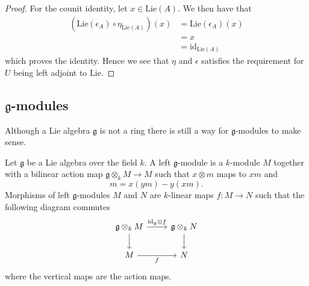 \begin{proof}
  For the counit identity, let $ x \in \text{Lie}(A) $. We then have that
  \begin{align*}
    (\text{Lie}(\epsilon_A) \circ \eta_{\text{Lie}(A)})(x) &= \text{Lie}(\epsilon_A)(x) \\
                                                           &= x \\
                                                           &= \text{id}_{\text{Lie}(A)}
  \end{align*}
  which proves the identity. Hence we see that $ \eta $ and $ \epsilon $ satisfies the requirement for $ U $ being left adjoint to $ \text{Lie} $.
\end{proof}

\subsection{$ \mathfrak{g} $-modules} %
\label{sec:gmodules}
Although a Lie algebra $ \mathfrak{g} $ is not a ring there is still a way for $ \mathfrak{g} $-modules to make sense.
\begin{definition}
  Let $ \mathfrak{g} $ be a Lie algebra over the field $ k $. A left $ \mathfrak{g} $-module is a $ k $-module $ M $ together with a bilinear action map $ \mathfrak{g} \otimes_k M \to M $ such that $ x \otimes m $ maps to $ xm $ and
  \begin{equation}
    [x,y]m = x(ym) - y(xm).
    \label{eq:whoknow}
  \end{equation}
  Morphisms of left $ \mathfrak{g} $-modules $ M $ and $ N $ are $ k $-linear maps
  $ f: M \to N $ such that the following diagram commutes
  \[\begin{tikzcd}
	  {\mathfrak{g} \otimes_k M} & {\mathfrak{g} \otimes_k N} \\
	  M & N
	  \arrow[from=1-1, to=2-1]
	  \arrow["f"', from=2-1, to=2-2]
	  \arrow[from=1-2, to=2-2]
	  \arrow["{\text{id}_\mathfrak{g} \otimes f}", from=1-1, to=1-2]
  \end{tikzcd}\]
  where the vertical maps are the action maps.
\end{definition}

